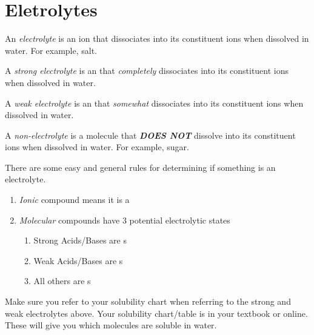 \section{Eletrolytes} \label{sec:Eletrolytes}
\begin{definition}[Eletrolyte] \label{def:Electrolyte}
  An \emph{electrolyte} is an ion that dissociates into its constituent ions when dissolved in water.
  For example, salt.
\end{definition}

\begin{definition} \label{def:Strong Electrolyte}
  A \emph{strong electrolyte} is an  that \emph{completely} dissociates into its constituent ions when dissolved in water.
\end{definition}

\begin{definition} \label{def:Weak Electrolyte}
  A \emph{weak electrolyte} is an  that \emph{somewhat} dissociates into its constituent ions when dissolved in water.
\end{definition}

\begin{definition} \label{def:Non-Electrolyte}
  A \emph{non-electrolyte} is a molecule that \textbf{\emph{DOES NOT}} dissolve into its constituent ions when dissolved in water.
  For example, sugar.
\end{definition}

There are some easy and general rules for determining if something is an electrolyte.
\begin{enumerate}
\item \emph{Ionic} compound means it is a 
\item \emph{Molecular} compounds have 3 potential electrolytic states
  \begin{enumerate}
  \item Strong Acids/Bases are s
  \item Weak Acids/Bases are s
  \item All others are s
  \end{enumerate}
\end{enumerate}

Make sure you refer to your solubility chart when referring to the strong and weak electrolytes above.
Your solubility chart/table is in your textbook or online.
These will give you which molecules are soluble in water.

